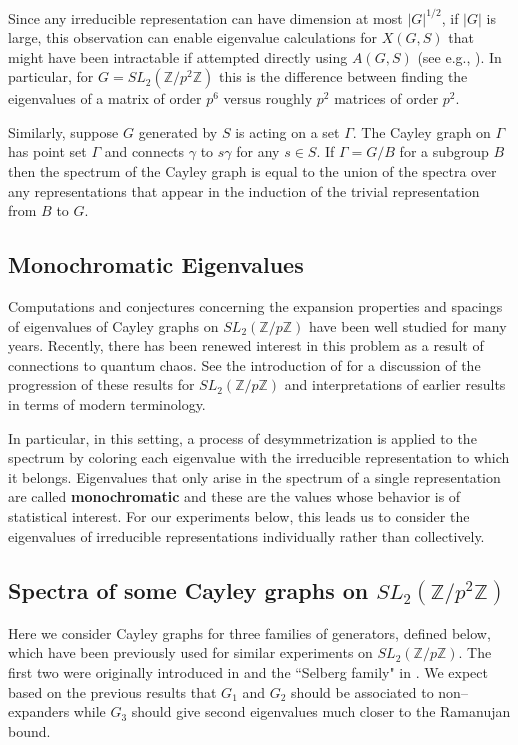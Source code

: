 \documentclass[12pt,reqno]{amsart}
\theoremstyle{remark}
\numberwithin{table}{section}
\newcommand{\Z}{\mathbb Z}
\newcommand{\slp}{SL_2(\Z/p \Z)}
\newcommand{\slpsq}{SL_2(\Z/p^2 \Z)}
\begin{document}
Since any irreducible representation can have dimension at most $|G|^{1/2}$, if $|G|$ is large, this observation can enable eigenvalue calculations for $X(G,S)$ that might have been intractable if attempted directly using $A(G,S)$ (see e.g., \cite{LR92,LR93}). In particular, for $G=\slpsq$ this is the difference between finding the eigenvalues of a matrix of order $p^6$ versus roughly $p^2$ matrices of order $p^2$.

Similarly, suppose $G$ generated by $S$ is acting on a set $\Gamma$. The Cayley graph on $\Gamma$ has point set $\Gamma$ and connects $\gamma$ to $s\gamma $ for any $s\in S$. If $\Gamma = G/B$ for a subgroup $B$ then the spectrum of the Cayley graph is equal to the union of the spectra over any representations that appear in the induction of the trivial representation from $B$ to $G$. 

\subsection{Monochromatic Eigenvalues} Computations and conjectures concerning the expansion properties and spacings of eigenvalues of Cayley graphs on $\slp$ have been well studied for many years.  Recently, there has been renewed interest in this problem as a result of connections to quantum chaos. See the introduction of \cite{RS} for a discussion of the progression of these results for $\slp$ and interpretations of earlier results in terms of modern terminology. 

In particular, in this setting, a process of desymmetrization is applied to the spectrum by coloring each eigenvalue with the irreducible representation to which it belongs. Eigenvalues that only arise in the spectrum of a single representation are called {\bf monochromatic} and these are the values whose behavior is of statistical interest. For our experiments below, this leads us to consider the eigenvalues of irreducible representations individually rather than collectively. 

\subsection{Spectra of some Cayley graphs on $SL_2(\Z /p^2 \Z)$}
Here we consider Cayley graphs for three families of generators, defined below, which have been previously used for similar experiments on $SL_2(\Z/p\Z)$. The first two were originally introduced in \cite{LR92} and the ``Selberg family" in \cite{LR99,RS}. We expect based on the previous results that $G_1$ and $G_2$ should be associated to non--expanders while $G_3$ should give second eigenvalues much closer to the Ramanujan bound.  
\end{document}
